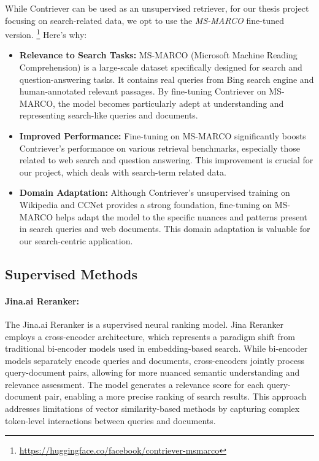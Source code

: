 While Contriever can be used as an unsupervised retriever, for our thesis project focusing on search-related data, we opt to use the \textit{MS-MARCO} fine-tuned version. \footnote{\url{https://huggingface.co/facebook/contriever-msmarco}}
Here's why:
\begin{itemize}
    \item \textbf{Relevance to Search Tasks:} MS-MARCO (Microsoft Machine Reading Comprehension) is a large-scale dataset specifically designed for search and question-answering tasks. It contains real queries from Bing search engine and human-annotated relevant passages. By fine-tuning Contriever on MS-MARCO, the model becomes particularly adept at understanding and representing search-like queries and documents.
    \item \textbf{Improved Performance:} Fine-tuning on MS-MARCO significantly boosts Contriever's performance on various retrieval benchmarks, especially those related to web search and question answering. This improvement is crucial for our project, which deals with search-term related data.
    \item \textbf{Domain Adaptation:} Although Contriever's unsupervised training on Wikipedia and CCNet provides a strong foundation, fine-tuning on MS-MARCO helps adapt the model to the specific nuances and patterns present in search queries and web documents. This domain adaptation is valuable for our search-centric application.
\end{itemize}

\subsection{Supervised Methods}\label{subsec:supervised-methods}
\paragraph{Jina.ai Reranker:}
The Jina.ai Reranker is a supervised neural ranking model.
Jina Reranker employs a cross-encoder architecture, which represents a paradigm shift from traditional bi-encoder models used in embedding-based search.
While bi-encoder models separately encode queries and documents, cross-encoders jointly process query-document pairs, allowing for more nuanced semantic understanding and relevance assessment.
The model generates a relevance score for each query-document pair, enabling a more precise ranking of search results.
This approach addresses limitations of vector similarity-based methods by capturing complex token-level interactions between queries and documents.

